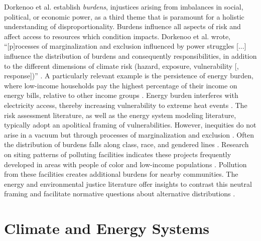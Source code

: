     Dorkenoo et al. \cite{dorkenoo_critical_2022} establish \textit{burdens}, injustices arising from imbalances in social, political, or economic power, as a third theme that is paramount for a holistic understanding of disproportionality. Burdens influence all aspects of risk and affect access to resources which condition impacts. Dorkenoo et al. wrote, ``[p]rocesses of marginalization and exclusion influenced by power struggles [...] influence the distribution of burdens and consequently responsibilities, in addition to the different dimensions of climate risk (hazard, exposure, vulnerability [, response])'' \cite{dorkenoo_critical_2022}. A particularly relevant example is the persistence of energy burden, where low-income households pay the highest percentage of their income on energy bills, relative to other income groups \cite{brown_high_2020, cong_unveiling_2022}. Energy burden interferes with electricity access, thereby increasing vulnerability to extreme heat events \cite{cong_unveiling_2022, klinenberg_heat_2003}. The risk assessment literature, as well as the energy system modeling literature, typically adopt an apolitical framing of vulnerabilities. However, inequities do not arise in a vacuum but through processes of marginalization and exclusion \cite{thomas_explaining_2019}. Often the distribution of burdens falls along 
    class, race, and gendered lines \cite{thomas_explaining_2019,mohai_which_2015}. Research on siting patterns of polluting facilities indicates these projects frequently developed in areas with people of color and low-income populations \cite{mohai_which_2015}. Pollution from these facilities creates additional burdens for nearby communities. The energy and environmental justice literature
    offer insights to contrast this neutral framing and facilitate normative questions about alternative distributions \cite{dorkenoo_critical_2022, thomas_explaining_2019}.
    
\noindent\hrulefill

\section{Climate and Energy Systems}

